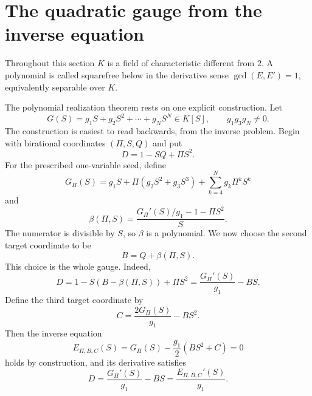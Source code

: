 \section{The quadratic gauge from the inverse equation}\label{sec:gauge}

Throughout this section \(K\) is a field of characteristic different from
\(2\).  A polynomial is called squarefree below in the derivative sense
\(\gcd(E,E')=1\), equivalently separable over \(K\).

The polynomial realization theorem rests on one explicit construction.
Let
\begin{equation}
 G(S)=g_1S+g_2S^2+\cdots+g_NS^N\in K[S],
 \qquad g_1g_3g_N\neq0.
 \label{eq:seed}
\end{equation}
The construction is easiest to read backwards, from the inverse problem.
Begin with birational coordinates \((\Pi,S,Q)\) and put
\begin{equation}
 D=1-SQ+\Pi S^2.
 \label{eq:D-compact}
\end{equation}
For the prescribed one-variable seed, define
\begin{equation}
 G_\Pi(S)=g_1S+\Pi(g_2S^2+g_3S^3)
          +\sum_{k=4}^Ng_k\Pi^kS^k
 \label{eq:Gpi}
\end{equation}
and
\begin{equation}
 \beta(\Pi,S)
 =\frac{G_\Pi'(S)/g_1-1-\Pi S^2}{S}.
 \label{eq:beta}
\end{equation}
The numerator is divisible by \(S\), so \(\beta\) is a polynomial.  We now
choose the second target coordinate to be
\begin{equation}
 B=Q+\beta(\Pi,S).
 \label{eq:B-compact}
\end{equation}
This choice is the whole gauge.  Indeed,
\[
 D
 =1-S(B-\beta(\Pi,S))+\Pi S^2
 =\frac{G_\Pi'(S)}{g_1}-BS.
\]
Define the third target coordinate by
\begin{equation}
 C=\frac{2G_\Pi(S)}{g_1}-BS^2.
 \label{eq:C-compact}
\end{equation}
Then the inverse equation
\begin{equation}
 E_{\Pi,B,C}(S)
 =G_\Pi(S)-\frac{g_1}{2}(BS^2+C)=0
 \label{eq:inverse}
\end{equation}
holds by construction, and its derivative satisfies
\begin{equation}
 D=\frac{G_\Pi'(S)}{g_1}-BS
 =\frac{E_{\Pi,B,C}'(S)}{g_1}.
 \label{eq:D-derivative}
\end{equation}

